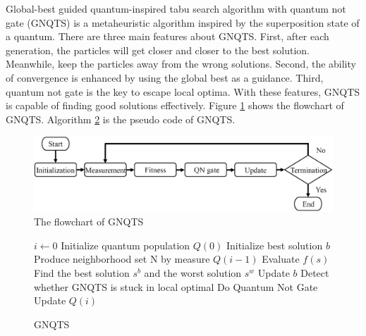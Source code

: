 \documentclass[../Proposed Method.tex]{subfiles}
\begin{document}
Global-best guided quantum-inspired tabu search algorithm with quantum not gate (GNQTS) is a metaheuristic algorithm inspired by the superposition state of a quantum. There are three main features about GNQTS. First, after each generation, the particles will get closer and closer to the best solution. Meanwhile, keep the particles away from the wrong solutions. Second, the ability of convergence is enhanced by using the global best as a guidance. Third, quantum not gate is the key to escape local optima. With these features, GNQTS is capable of finding good solutions effectively. Figure \ref{flow} shows the flowchart of GNQTS. Algorithm \ref{GN_pseudo} is the pseudo code of GNQTS.

\begin{figure}[H]
    \centering
    \includegraphics[scale = 0.4] {figure/flowChart.png}
    \caption{The flowchart of GNQTS}
    \label{flow}
\end{figure}

\begin{figure}[H]
    \centering
    \begin{minipage}{.6\linewidth}
        \begin{algorithm}[H]
            \caption{GNQTS}
            \label{GN_pseudo}
            \begin{algorithmic}[1]
                \State $i \leftarrow 0$
                \State Initialize quantum  population $Q(0)$
                \State Initialize best solution $b$
                \State Produce neighborhood set N by measure $Q(i-1)$
                \State Evaluate $f(s)$
                \State Find the best solution $s^b$ and the worst solution $s^w$
                \State Update $b$
                \State Detect whether GNQTS is stuck in local optimal
                \State Do Quantum Not Gate
                \EndIf
                \State Update $Q(i)$
                \EndWhile
            \end{algorithmic}
        \end{algorithm}
    \end{minipage}
\end{figure}
\end{document}
